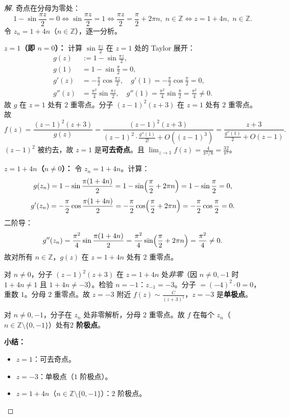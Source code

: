 \documentclass[11pt,a4paper]{article}
\newcommand{\Z}{\mathbb{Z}}
\theoremstyle{definition}
\newenvironment{solution}{\begin{proof}[解]}{\end{proof}}
\begin{document}
\begin{solution}
  奇点在分母为零处：
  \[
    1 - \sin\frac{\pi z}{2} = 0 \iff \sin\frac{\pi z}{2} = 1
    \iff \frac{\pi z}{2} = \frac{\pi}{2} + 2\pi n,\; n \in \Z
    \iff z = 1 + 4n,\; n \in \Z.
  \]
  令 $z_n = 1 + 4n$（$n \in \Z$），逐一分析。

  \medskip
  \noindent\textbf{$z = 1$（即 $n = 0$）：}
  计算 $\sin\frac{\pi z}{2}$ 在 $z = 1$ 处的 Taylor 展开：
  \begin{align*}
    g(z) &:= 1 - \sin\frac{\pi z}{2}, \\
    g(1) &= 1 - \sin\frac{\pi}{2} = 0,\\
    g'(z) &= -\frac{\pi}{2} \cos\frac{\pi z}{2}, \quad
    g'(1) = -\frac{\pi}{2} \cos\frac{\pi}{2} = 0,\\
    g''(z) &= \frac{\pi^2}{4} \sin\frac{\pi z}{2}, \quad
    g''(1) = \frac{\pi^2}{4} \sin\frac{\pi}{2} = \frac{\pi^2}{4} \ne 0.
  \end{align*}
  故 $g$ 在 $z = 1$ 处有 $2$ 重零点。分子 $(z-1)^2(z+3)$ 在 $z = 1$ 处有 $2$ 重零点。故
  \[
    f(z) = \frac{(z-1)^2(z+3)}{g(z)} =
    \frac{(z-1)^2(z+3)}{(z-1)^2 \cdot \frac{g''(1)}{2!} + O((z-1)^3)}
    = \frac{z+3}{\frac{g''(1)}{2} + O(z-1)}.
  \]
  $(z-1)^2$ 被约去，故 $z = 1$ 是\textbf{可去奇点}。且 $\lim_{z \to 1} f(z) = \frac{4}{\pi^2/8} = \frac{32}{\pi^2}$。

  \medskip
  \noindent\textbf{$z = 1 + 4n$（$n \ne 0$）：}
  令 $z_n = 1 + 4n$。计算：
  \[
    g(z_n) = 1 - \sin\frac{\pi(1+4n)}{2} = 1 - \sin\Bigl(\frac{\pi}{2} + 2\pi n\Bigr)
    = 1 - \sin\frac{\pi}{2} = 0,
  \]
  \[
    g'(z_n) = -\frac{\pi}{2} \cos\frac{\pi(1+4n)}{2}
    = -\frac{\pi}{2} \cos\Bigl(\frac{\pi}{2} + 2\pi n\Bigr)
    = -\frac{\pi}{2} \cos\frac{\pi}{2} = 0.
  \]
  二阶导：
  \[
    g''(z_n) = \frac{\pi^2}{4} \sin\frac{\pi(1+4n)}{2}
    = \frac{\pi^2}{4} \sin\Bigl(\frac{\pi}{2} + 2\pi n\Bigr)
    = \frac{\pi^2}{4} \ne 0.
  \]
  故对所有 $n \in \Z$，$g(z)$ 在 $z = 1+4n$ 处有 $2$ 重零点。

  对 $n \ne 0$，分子 $(z-1)^2(z+3)$ 在 $z = 1+4n$ 处\emph{非零}（因 $n \ne 0, -1$ 时 $1+4n \ne 1$ 且 $1+4n \ne -3$）。检验 $n = -1$：$z_{-1} = -3$。分子 $= (-4)^2 \cdot 0 = 0$，重数 $1$。分母 $2$ 重零点。故 $z = -3$ 附近 $f(z) \sim \frac{C}{(z+3)^1}$，$z = -3$ 是\textbf{单极点}。

  对 $n \ne 0, -1$，分子在 $z_n$ 处非零解析，分母 $2$ 重零点。故 $f$ 在每个 $z_n$（$n \in \Z \setminus \{0, -1\}$）处有\textbf{$2$ 阶极点}。

  \medskip
  \noindent\textbf{小结：}
  \begin{itemize}
    \item $z = 1$：可去奇点。
    \item $z = -3$：单极点（$1$ 阶极点）。
    \item $z = 1 + 4n$（$n \in \Z \setminus \{0, -1\}$）：$2$ 阶极点。
  \end{itemize}
\end{solution}
\end{document}
